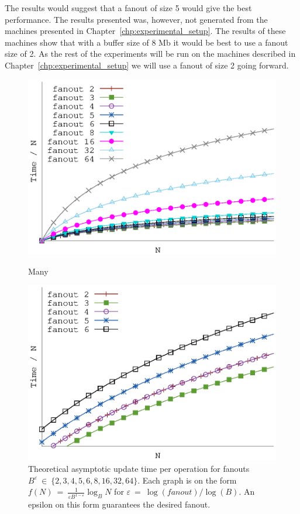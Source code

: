 \documentclass[twoside,11pt,openright]{report}
\def \epsilon {\varepsilon}
\begin{document}
The results would suggest that a fanout of size 5 would give the best performance.
The results presented was, however, not generated from the machines presented in Chapter~\ref{chp:experimental_setup}. The results of these machines show that with a buffer size of 8 Mb it would be best to use a fanout size of 2. As the rest of the experiments will be run on the machines described in Chapter~\ref{chp:experimental_setup} we will use a fanout of size 2 going forward.

\begin{figure}[h]
\centering
\begin{minipage}[t]{0.48\columnwidth}
  \centering
  \includegraphics[width=\linewidth]{../plots/gerth_update_epsilon/gerth_epsilon}
  \caption{Theoretical asymptotic update time per operation for fanouts $B^\epsilon~\in~\{2, 3, 4, 5, 6, 8, 16, 32, 64\}$. Each graph is on the form $f(N)~=~\frac{1}{\epsilon B^{1-\epsilon}} \log_B N$ for $\epsilon~=~\log(fanout) / \log(B)$. An epsilon on this form guarantees the desired fanout.}
  \label{fig:gerth_fanout_experiment}Many
\end{minipage}
\hfill
\begin{minipage}[t]{0.48\columnwidth}
  \centering
  \includegraphics[width=\linewidth]{../plots/gerth_update_epsilon/gerth_epsilon_zoom}

\end{minipage}
\end{figure}
\end{document}
